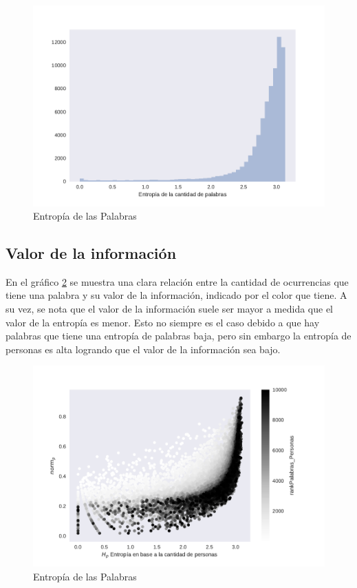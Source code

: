 \begin{figure}[ht]
\centering
\includegraphics[width=1.0\textwidth]{./images/DistribucionEntropia.pdf}
\caption{Entropía de las Palabras} 
\label{fig:entropiaPalabras} 
\end{figure}



\subsection{Valor de la información}
\label{sub:ValorDeLaInformacion}
En el gráfico \ref{fig:infoValue} se muestra una clara relación entre la cantidad de ocurrencias que tiene una palabra y su valor de la información, indicado por el color que tiene. A su vez, se nota que el valor de la información suele ser mayor a medida que el valor de la entropía es menor. Esto no siempre es el caso debido a que hay palabras que tiene una entropía de palabras baja, pero sin embargo la entropía de personas es alta logrando que el valor de la información sea bajo.

\begin{figure}[ht]
\centering
\includegraphics[width=1.0\textwidth]{./images/entropiaPersonasxNormCantPersonas.pdf}
\caption{Entropía de las Palabras} 
\label{fig:infoValue} 
\end{figure}

